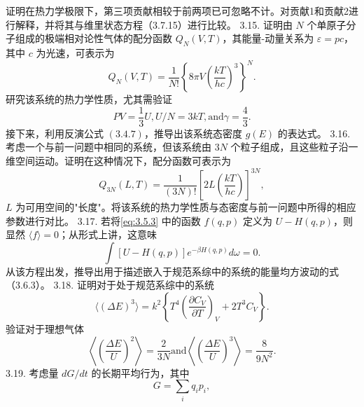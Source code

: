 证明在热力学极限下，第三项贡献相较于前两项已可忽略不计。对贡献1和贡献2进行解释，并将其与维里状态方程（3.7.15）进行比较。
3.15. 证明由 \(N\) 个单原子分子组成的极端相对论性气体的配分函数 \(Q_{N}(V,T)\)，其能量-动量关系为 \(\varepsilon=pc\)，其中 \(c\) 为光速，可表示为
\begin{equation}\tag{3.5.126}\label{eq:3.5.126}
Q _ { N } ( V , T ) = \frac { 1 } { N ! } \left\{ 8 \pi V \left( \frac { k T } { h c } \right) ^{3} \right\} ^{N} .
\end{equation}
研究该系统的热力学性质，尤其需验证
\begin{equation}\tag{3.5.127}\label{eq:3.5.127}
P V = \frac { 1 } { 3 } U ,  U / N = 3 k T ,  \mathrm { a n d }  \gamma = \frac { 4 } { 3 } .
\end{equation}
接下来，利用反演公式 \((3.4.7)\)，推导出该系统态密度 \(g(E)\) 的表达式。
3.16. 考虑一个与前一问题中相同的系统，但该系统由 \(3N\) 个粒子组成，且这些粒子沿一维空间运动。证明在这种情况下，配分函数可表示为
\begin{equation}\tag{3.5.128}\label{eq:3.5.128}
Q _ { 3 N } ( L , T ) = \frac { 1 } { ( 3 N ) ! } \left[ 2 L \left( \frac { k T } { h c } \right) \right] ^{3 N} ,
\end{equation}
\(L\) 为可用空间的"长度"。将该系统的热力学性质与态密度与前一问题中所得的相应参数进行对比。
3.17. 若将\autoref{eq:3.5.3} 中的函数 \(f(q,p)\) 定义为 \(U-H(q,p)\)，则显然 \(\langle f \rangle = 0\)；从形式上讲，这意味
\begin{equation}\tag{3.5.129}\label{eq:3.5.129}
\int [ U - H ( q , p ) ] e ^{- \beta H ( q , p )} d \omega = 0 .
\end{equation}
从该方程出发，推导出用于描述嵌入于规范系综中的系统的能量均方波动的式（3.6.3）。
3.18. 证明对于处于规范系综中的系统
\begin{equation}\tag{3.5.130}\label{eq:3.5.130}
\langle ( \Delta E ) ^{3} \rangle = k ^{2} \left\{ T ^{4} \left( \frac { \partial C _ { V } } { \partial T } \right) _ { V } + 2 T ^{3} C _ { V } \right\} .
\end{equation}
验证对于理想气体
\begin{equation}\tag{3.5.131}\label{eq:3.5.131}
\left\langle \left( \frac { \Delta E } { U } \right) ^{2} \right\rangle = \frac { 2 } { 3 N }  \mathrm { a n d }  \left\langle \left( \frac { \Delta E } { U } \right) ^{3} \right\rangle = \frac { 8 } { 9 N ^{2} } .
\end{equation}
3.19. 考虑量 \(dG/dt\) 的长期平均行为，其中
\begin{equation}\tag{3.5.132}\label{eq:3.5.132}
G = \sum _ { i } q _ { i } p _ { i } ,
\end{equation}
